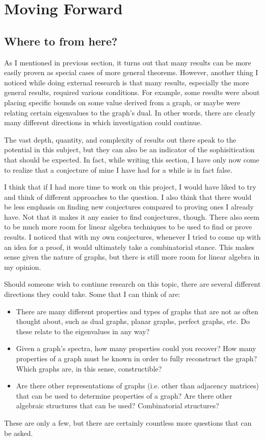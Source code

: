 \documentclass{article}
\begin{document}
\newpage
\section{Moving Forward}
\subsection{Where to from here?}

As I mentioned in previous section, it turns out that many results can be more easily proven as special cases of more general theorems.
However, another thing I noticed while doing external research is that many results, especially the more general results, required various conditions.
For example, some results were about placing specific bounds on some value derived from a graph, or maybe were relating certain eigenvalues to the graph's dual.
In other words, there are clearly many different directions in which investigation could continue.

The vast depth, quantity, and complexity of results out there speak to the potential in this subject, but they can also be an indicator of the sophisitication that should be expected.
In fact, while writing this section, I have only now come to realize that a conjecture of mine I have had for a while is in fact false.

I think that if I had more time to work on this project, I would have liked to try and think of different approaches to the question.
I also think that there would be less emphasis on finding new conjectures compared to proving ones I already have. Not that it makes it any easier to find conjectures, though.
There also seem to be much more room for linear algebra techniques to be used to find or prove results.
I noticed that with my own conjectures, whenever I tried to come up with an idea for a proof, it would ultimately take a combinatorial stance.
This makes sense given the nature of graphs, but there is still more room for linear algebra in my opinion.

Should someone wish to continue research on this topic, there are several different directions they could take.
Some that I can think of are:
\begin{itemize}
    \item There are many different properties and types of graphs that are not as often thought about, such as dual graphs, planar graphs, perfect graphs, etc.
        Do these relate to the eigenvalues in any way?
    \item Given a graph's spectra, how many properties could you recover? How many properties of a graph must be known in order to fully reconstruct the graph?
        Which graphs are, in this sense, constructible?
    \item Are there other representations of graphs (i.e. other than adjacency matrices) that can be used to determine properties of a graph?
        Are there other algebraic structures that can be used? Combinatorial structures?
\end{itemize}
These are only a few, but there are certainly countless more questions that can be asked.
\end{document}
